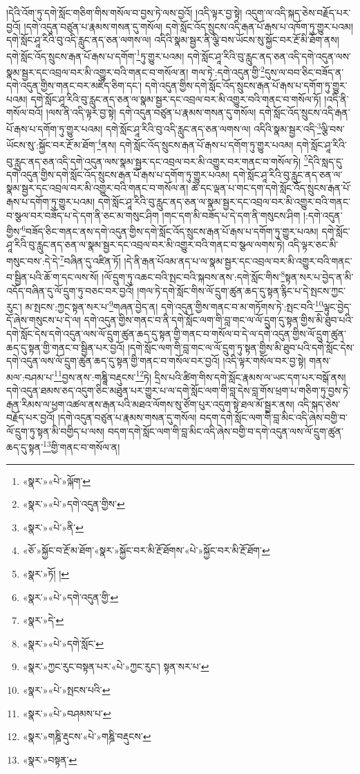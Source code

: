 །དེའི་འོག་ཏུ་དགེ་སློང་གཅིག་གིས་གསོལ་བ་བྱས་ཏེ་ལས་བྱའོ། །འདི་ལྟར་བྱ་སྟེ། འདུག་ལ་འདི་སྐད་ཅེས་བརྗོད་པར་བྱའོ། །དགེ་འདུན་བཙུན་པ་རྣམས་གསན་དུ་གསོལ། དགེ་སློང་འོད་སྲུངས་འདི་རྒན་པོ་རྒས་པ་འཁོག་ཏུ་གྱུར་པའམ། དགེ་སློང་ཤཱ་རིའི་བུ་འདི་རླུང་ནད་ཅན་ལགས་ལ། འདིའི་སྣམ་སྦྱར་ནི་ལྕི་བས་ཡོངས་སུ་སྐྱོང་བར་རྔོ་མི་ཐོག་ནས། དགེ་སློང་འོད་སྲུངས་རྒན་པོ་རྒས་པ་དགོག་\footnote{«སྣར་»«པེ་»ལྐོག་}ཏུ་གྱུར་པའམ། དགེ་སློང་ཤཱ་རིའི་བུ་རླུང་ནད་ཅན་འདི་དགེ་འདུན་ལས་སྣམ་སྦྱར་དང་འབྲལ་བར་མི་འགྱུར་བའི་གནང་བ་གསོལ་ན། གལ་ཏེ་:དགེ་འདུན་གྱི་\footnote{«སྣར་»«པེ་»དགེ་འདུན་གྱིས་}དུས་ལ་བབ་ཅིང་བཟོད་ན་དགེ་འདུན་གྱིས་གནང་བར་མཛོད་ཅིག་དང་། དགེ་འདུན་གྱིས་དགེ་སློང་འོད་སྲུངས་རྒན་པོ་རྒས་པ་དགོག་ཏུ་གྱུར་པའམ། དགེ་སློང་ཤཱ་རིའི་བུ་རླུང་ནད་ཅན་ལ་སྣམ་སྦྱར་དང་འབྲལ་བར་མི་འགྱུར་བའི་གནང་བ་གསོལ་ཏོ། །འདི་ནི་གསོལ་བའོ། །ལས་ནི་འདི་ལྟར་བྱ་སྟེ། དགེ་འདུན་བཙུན་པ་རྣམས་གསན་དུ་གསོལ། དགེ་སློང་འོད་སྲུངས་འདི་རྒན་པོ་རྒས་པ་དགོག་ཏུ་གྱུར་པའམ། དགེ་སློང་ཤཱ་རིའི་བུ་འདི་རླུང་ནད་ཅན་ལགས་ལ། འདིའི་སྣམ་སྦྱར་འདི་\footnote{«སྣར་»«པེ་»ནི་}ལྕི་བས་ཡོངས་སུ་:སྐྱོང་བར་རྔོ་མ་ཐོག་\footnote{«ཅོ་»སྐྱོང་བ་རྔོ་མ་ཐོག་«སྣར་»སྐྱོང་བར་མི་རྔོ་ཐོགས་«པེ་»སྐྱོང་བར་མི་རྔོ་ཐོག་}ནས། དགེ་སློང་འོད་སྲུངས་རྒན་པོ་རྒས་པ་དགོག་ཏུ་གྱུར་པའམ། དགེ་སློང་ཤཱ་རིའི་བུ་རླུང་ནད་ཅན་འདི་དགེ་འདུན་ལས་སྣམ་སྦྱར་དང་འབྲལ་བར་མི་འགྱུར་བར་གནང་བ་གསོལ་ཏེ། \footnote{«སྣར་»ཏོ། ། }དེའི་སླད་དུ་དགེ་འདུན་གྱིས་དགེ་སློང་འོད་སྲུངས་རྒན་པོ་རྒས་པ་དགོག་ཏུ་གྱུར་པའམ། དགེ་སློང་ཤཱ་རིའི་བུ་རླུང་ནད་ཅན་ལ་སྣམ་སྦྱར་དང་འབྲལ་བར་མི་འགྱུར་བའི་གནང་བ་གསོལ་ན། ཚེ་དང་ལྡན་པ་གང་དག་དགེ་སློང་འོད་སྲུངས་རྒན་པོ་རྒས་པ་དགོག་ཏུ་གྱུར་པའམ། དགེ་སློང་ཤཱ་རིའི་བུ་རླུང་ནད་ཅན་ལ་སྣམ་སྦྱར་དང་འབྲལ་བར་མི་འགྱུར་བའི་གནང་བ་སྩལ་བར་བཟོད་པ་དེ་དག་ནི་ཅང་མ་གསུང་ཤིག །གང་དག་མི་བཟོད་པ་དེ་དག་ནི་གསུངས་ཤིག །:དགེ་འདུན་གྱིས་\footnote{«སྣར་»«པེ་»དགེ་འདུན་གྱི་}བཟོད་ཅིང་གནང་ནས་དགེ་འདུན་གྱིས་དགེ་སློང་འོད་སྲུངས་རྒན་པོ་རྒས་པ་དགོག་ཏུ་གྱུར་པའམ། དགེ་སློང་ཤཱ་རིའི་བུ་རླུང་ནད་ཅན་ལ་སྣམ་སྦྱར་དང་འབྲལ་བར་མི་འགྱུར་བའི་གནང་བ་སྩལ་ལགས་ཏེ། འདི་ལྟར་ཅང་མི་གསུང་བས་:དེ་དེ་\footnote{«སྣར་»དེ་}བཞིན་དུ་འཛིན་ཏོ། །དེ་ནི་རྒན་པོའམ་ནད་པ་ལ་སྣམ་སྦྱར་དང་འབྲལ་བར་མི་འགྱུར་བའི་གནང་བ་སྦྱིན་པའི་ཆོ་ག་དང་ལས་སོ། །ལོ་དྲུག་ཏུ་འཆང་བའི་སྤང་བའི་སྐབས་ནས་:དགེ་སློང་གིས་\footnote{«སྣར་»«པེ་»དགེ་སློང་}སྟན་སར་པ་བྱེད་ན་མི་འདོད་བཞིན་དུ་ལོ་དྲུག་ཏུ་བཅང་བར་བྱའོ། །གལ་ཏེ་དགེ་སློང་གིས་ལོ་དྲུག་ཚུན་ཆད་དུ་སྟན་རྙིང་པ་དེ་སྤངས་ཀྱང་རུང་། མ་སྤངས་:ཀྱང་སྟན་སར་པ་\footnote{«སྣར་»ཀྱང་རུང་བསྟན་པར་«པེ་»ཀྱང་རུང་། སྟན་སར་པ་}གཞན་བྱེད་ན། དགེ་འདུན་གྱིས་གནང་བ་མ་གཏོགས་ཏེ་:སྤང་བའི་\footnote{«སྣར་»«པེ་»སྤངས་པའི་}ལྟུང་བྱེད་དོ་ཞེས་གསུངས་པ་དེ་ལ། དགེ་འདུན་གྱིས་གནང་བ་ནི་དགེ་སློང་ལག་གི་བླ་གང་ལ་ལོ་དྲུག་དུ་སྟན་གྱིས་མི་ཐུབ་པའི་དགེ་སློང་དེས་དགེ་འདུན་ལས་ལོ་དྲུག་ཚུན་ཆད་དུ་སྟན་གྱི་གནང་བ་གསོལ་བ་དེ་ལ་དགེ་འདུན་གྱིས་ལོ་དྲུག་ཚུན་ཆད་དུ་སྟན་གྱི་གནང་བ་སྦྱིན་པར་བྱའོ། །དགེ་སློང་ལག་གི་བླ་གང་ལ་ལོ་དྲུག་ཏུ་སྟན་གྱིས་མི་ཐུབ་པའི་དགེ་སློང་དེས་དགེ་འདུན་ལས་ལོ་དྲུག་ཚུན་ཆད་དུ་སྟན་གྱི་གནང་བ་གསོལ་བར་བྱའོ། །འདི་ལྟར་གསོལ་བར་བྱ་སྟེ། གནས་མལ་:བཤམ་པ་\footnote{«སྣར་»«པེ་»བཤམས་པ་}བྱས་ནས་:གཎྜཱི་བརྡུངས་\footnote{«སྣར་»གཎྜི་རྡུངས་«པེ་»གཎྜི་བརྡུངས་}ཏེ། དྲིས་པའི་ཚིག་གིས་དགེ་སློང་རྣམས་ལ་ཡང་དག་པར་བསྒོ་ནས། དགེ་འདུན་ཐམས་ཅད་འདུག་ཅིང་མཐུན་པར་གྱུར་པ་ལ་དགེ་སློང་ལག་གི་བླ་དེས་བླ་གོས་ཕྲག་པ་གཅིག་ཏུ་བྱས་ཏེ་རྒན་རིམས་ལ་ཕྱག་འཚལ་ནས་རྒན་པའི་མཐའ་ལོགས་སུ་ཙོག་པུར་འདུག་སྟེ་ཐལ་མོ་སྦྱར་ནས། འདི་སྐད་ཅེས་བརྗོད་པར་བྱའོ། །དགེ་འདུན་བཙུན་པ་རྣམས་གསན་དུ་གསོལ། བདག་དགེ་སློང་ལག་གི་བླ་མིང་འདི་ཞེས་བགྱི་བ་ལོ་དྲུག་ཏུ་སྟན་མི་བགྱིད་པ་ལས། བདག་དགེ་སློང་ལག་གི་བླ་མིང་འདི་ཞེས་བགྱི་བ་དགེ་འདུན་ལས་ལོ་དྲུག་ཚུན་ཆད་དུ་སྟན་\footnote{«སྣར་»བསྟན་}གྱི་གནང་བ་གསོལ་ན། 